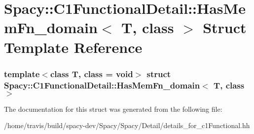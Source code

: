 \hypertarget{structSpacy_1_1C1FunctionalDetail_1_1HasMemFn__domain}{\section{\-Spacy\-:\-:\-C1\-Functional\-Detail\-:\-:\-Has\-Mem\-Fn\-\_\-domain$<$ \-T, class $>$ \-Struct \-Template \-Reference}
\label{structSpacy_1_1C1FunctionalDetail_1_1HasMemFn__domain}
}
\subsubsection*{template$<$class T, class = void$>$ struct Spacy\-::\-C1\-Functional\-Detail\-::\-Has\-Mem\-Fn\-\_\-domain$<$ T, class $>$}



\-The documentation for this struct was generated from the following file\-:\begin{DoxyCompactItemize}
\item 
/home/travis/build/spacy-\/dev/\-Spacy/\-Spacy/\-Detail/details\-\_\-for\-\_\-c1\-Functional.\-hh\end{DoxyCompactItemize}
